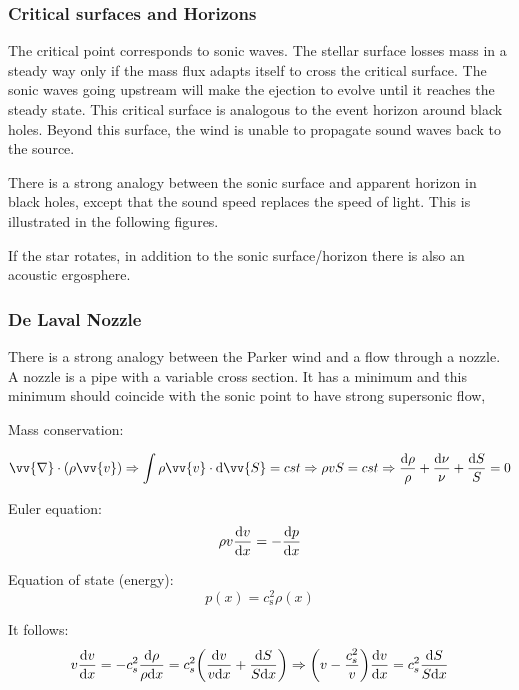 \documentclass[10pt,a4paper,english]{article}
\let\originalleft\left
\let\originalright\right
\renewcommand{\left}{\mathopen{}\mathclose\bgroup\originalleft}
\renewcommand{\right}{\aftergroup\egroup\originalright}
\begin{document}
\subsubsection{Critical surfaces and Horizons}

The critical point corresponds to sonic waves. The stellar surface losses mass
in a steady way only if the mass flux adapts itself to cross the critical
surface. The sonic waves going upstream will make the ejection to evolve until
it reaches the steady state. This critical surface is analogous to the event
horizon around black holes. Beyond this surface, the wind is unable to
propagate sound waves back to the source.

There is a strong analogy between the sonic surface and apparent horizon in
black holes, except that the sound speed replaces the speed of light. This is
illustrated in the following figures.


If the star rotates, in addition to the sonic surface/horizon there is also an
acoustic ergosphere.

\subsubsection{De Laval Nozzle}

There is a strong analogy between the Parker wind and a flow through a nozzle.
A nozzle is a pipe with a variable cross section. It has a minimum and this
minimum should coincide with the sonic point to have strong supersonic flow,


Mass conservation:

\begin{equation}
    \vv{\nabla}\cdot(\rho\vv{v}) \Rightarrow \int \rho\vv{v}\cdot \d \vv{S} = cst \Rightarrow \rho vS = cst
    \Rightarrow \frac{\d \rho}{\rho} + \frac{\d \nu}{\nu} + \frac{\d S}{S} = 0
\end{equation}

Euler equation:
\begin{equation}
    \rho v \frac{\mathrm{d} v}{\mathrm{d} x} = -\frac{\mathrm{d} p}{\mathrm{d} x}
\end{equation}

Equation of state (energy):
\begin{equation}
    p(x) = c_\mathrm{s}^2\rho(x)
\end{equation}

It follows:
\begin{equation}
    v\frac{\d v}{\d x} = -c_s^2\frac{\d\rho}{\rho \d x} = c_s^2\left(\frac{\d v}{v\d x}+\frac{\d S}{S\d x}\right)
    \Rightarrow \left( v - \frac{c_s^2}{v} \right)\frac{\d v}{\d x} = c_s^2\frac{\d S}{S \d x}
\end{equation}
\end{document}
